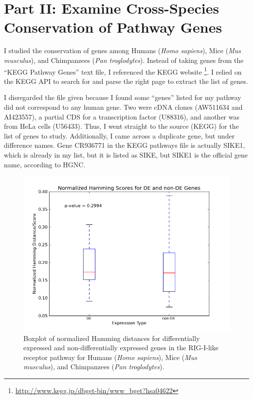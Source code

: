 \documentclass[12pt, a4paper]{report}
\begin{document}
\section*{Part II: Examine Cross-Species Conservation of Pathway Genes}

I studied the conservation of genes among Humans (\emph{Homo sapiens}), Mice (\emph{Mus musculus}), and Chimpanzees (\emph{Pan troglodytes}). Instead of taking genes from the ``KEGG Pathway Genes'' text file, I referenced the KEGG website \footnote{\url{http://www.kegg.jp/dbget-bin/www_bget?hsa04622}}. I relied on the KEGG API to search for and parse the right page to extract the list of genes.

I disregarded the file given because I found some ``genes'' listed for my pathway did not correspond to any human gene. Two were cDNA clones (AW511634 and AI423557), a partial CDS for a transcription factor (U88316), and another was from HeLa cells (U56433). Thus, I went straight to the source (KEGG) for the list of genes to study. Additionally, I came across a duplicate gene, but under difference names. Gene CR936771 in the KEGG pathways file is actually SIKE1, which is already in my list, but it is listed as SIKE, but SIKE1 is the official gene name, according to HGNC. 

\begin{figure}[ht]
\begin{center}
\includegraphics[width=12cm]{boxplot.png}
\caption{Boxplot of normalized Hamming distances for differentially expressed and non-differentially expressed genes in the RIG-I-like receptor pathway for Humans (\emph{Homo sapiens}), Mice (\emph{Mus musculus}), and Chimpanzees (\emph{Pan troglodytes}).\label{boxplot}}
\end{center}
\end{figure}
\end{document}
